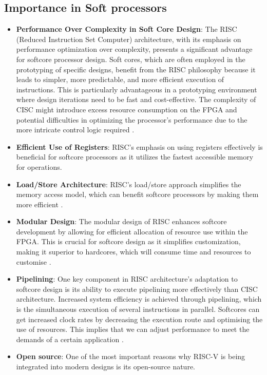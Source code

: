 \documentclass[conference]{IEEEtran}
\begin{document}
\subsection{Importance in Soft processors}
\begin{itemize}
   \item \textbf{Performance Over Complexity in Soft Core Design}: The RISC (Reduced Instruction Set Computer) architecture, with its emphasis on performance optimization over complexity, presents a significant advantage for softcore processor design. Soft cores, which are often employed in the prototyping of specific designs, benefit from the RISC philosophy because it leads to simpler, more predictable, and more efficient execution of instructions. This is particularly advantageous in a prototyping environment where design iterations need to be fast and cost-effective. The complexity of CISC might introduce excess resource consumption on the FPGA and potential difficulties in optimizing the processor’s performance due to the more intricate control logic required \cite{5}.
   
     \item \textbf{Efficient Use of Registers}: RISC's emphasis on using registers effectively is beneficial for softcore processors as it utilizes the fastest accessible memory for operations. 
    \item \textbf{Load/Store Architecture}: RISC's load/store approach simplifies the memory access model, which can benefit softcore processors by making them more efficient \cite{5}.

    \item \textbf{Modular Design}: The modular design of RISC enhances softcore development by allowing for efficient allocation of resource use within the FPGA. This is crucial for softcore design as it simplifies customization, making it superior to hardcores, which will consume time and resources to customise \cite{5}.
     \item \textbf{Pipelining}: One key component in RISC architecture's adaptation to softcore design is its ability to execute pipelining more effectively than CISC architecture. Increased system efficiency is achieved through pipelining, which is the simultaneous execution of several instructions in parallel. Softcores can get increased clock rates by decreasing the execution route and optimising the use of resources. This implies that we can adjust performance to meet the demands of a certain application \cite{5}.
     \item \textbf{Open source}: One of the most important reasons why RISC-V is being integrated into modern designs is its open-source nature.
     
\end{itemize}
\end{document}
